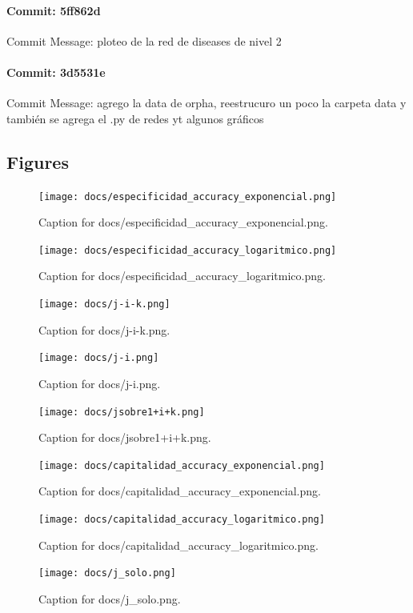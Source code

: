 \documentclass{article}
\begin{document}
\paragraph{Commit: 5ff862d}
Commit Message: ploteo de la red de diseases de nivel 2

\paragraph{Commit: 3d5531e}
Commit Message: agrego la data de orpha, reestrucuro un poco la carpeta data y también se agrega el .py de redes yt algunos gráficos

\subsection{Figures}
\begin{figure}[h] \centering \texttt{[image: docs/especificidad\_accuracy\_exponencial.png]} \caption{Caption for docs/especificidad_accuracy_exponencial.png.} \end{figure}
\begin{figure}[h] \centering \texttt{[image: docs/especificidad\_accuracy\_logaritmico.png]} \caption{Caption for docs/especificidad_accuracy_logaritmico.png.} \end{figure}
\begin{figure}[h] \centering \texttt{[image: docs/j-i-k.png]} \caption{Caption for docs/j-i-k.png.} \end{figure}
\begin{figure}[h] \centering \texttt{[image: docs/j-i.png]} \caption{Caption for docs/j-i.png.} \end{figure}
\begin{figure}[h] \centering \texttt{[image: docs/jsobre1+i+k.png]} \caption{Caption for docs/jsobre1+i+k.png.} \end{figure}
\begin{figure}[h] \centering \texttt{[image: docs/capitalidad\_accuracy\_exponencial.png]} \caption{Caption for docs/capitalidad_accuracy_exponencial.png.} \end{figure}
\begin{figure}[h] \centering \texttt{[image: docs/capitalidad\_accuracy\_logaritmico.png]} \caption{Caption for docs/capitalidad_accuracy_logaritmico.png.} \end{figure}
\begin{figure}[h] \centering \texttt{[image: docs/j\_solo.png]} \caption{Caption for docs/j_solo.png.} \end{figure}
\end{document}
